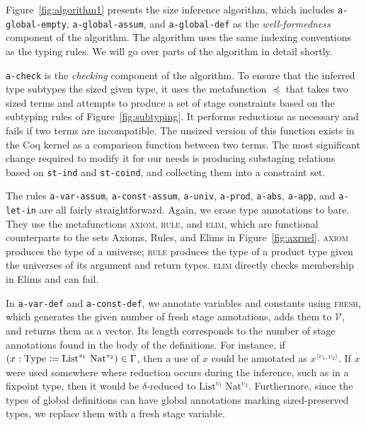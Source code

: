 \documentclass[sigplan,10pt,anonymous,review,nonacm]{acmart}
\begin{document}
Figure~\ref{fig:algorithm1} presents the size inference algorithm, which includes \texttt{a-global-empty}, \texttt{a-global-assum}, and \texttt{a-global-def} as the \textit{well-formedness} component of the algorithm. The algorithm uses the same indexing conventions as the typing rules. We will go over parts of the algorithm in detail shortly.

\texttt{a-check} is the \textit{checking} component of the algorithm. To ensure that the inferred type subtypes the sized given type, it uses the metafunction $\preceq$ that takes two sized terms and attempts to produce a set of stage constraints based on the subtyping rules of Figure~\ref{fig:subtyping}. It performs reductions as necessary and fails if two terms are incompatible. The unsized version of this function exists in the Coq kernel as a comparison function between two terms. The most significant change required to modify it for our needs is producing substaging relations based on \texttt{st-ind} and \texttt{st-coind}, and collecting them into a constraint set.

The rules \texttt{a-var-assum}, \texttt{a-const-assum}, \texttt{a-univ}, \texttt{a-prod}, \texttt{a-abs}, \texttt{a-app}, and \texttt{a-let-in} are all fairly straightforward. Again, we erase type annotations to bare. They use the metafunctions \textsc{axiom}, \textsc{rule}, and \textsc{elim}, which are functional counterparts to the sets Axioms, Rules, and Elims in Figure~\ref{fig:axruel}. \textsc{axiom} produces the type of a universe; \textsc{rule} produces the type of a product type given the universes of its argument and return types. \textsc{elim} directly checks membership in Elims and can fail.

In \texttt{a-var-def} and \texttt{a-const-def}, we annotate variables and constants using \textsc{fresh}, which generates the given number of fresh stage annotations, adds them to $\mathcal{V}$, and returns them as a vector. Its length corresponds to the number of stage annotations found in the body of the definitions. For instance, if $(x : \Type{} \coloneqq \text{List}^{s_1}\ \text{Nat}^{s_2}) \in \Gamma$, then a use of $x$ could be annotated as $x^{\langle \upsilon_1, \upsilon_2 \rangle}$. If $x$ were used somewhere where reduction occurs during the inference, such as in a fixpoint type, then it would be $\delta$-reduced to $\text{List}^{\upsilon_1}\ \text{Nat}^{\upsilon_2}$. Furthermore, since the types of global definitions can have global annotations marking sized-preserved types, we replace them with a fresh stage variable.
\end{document}
